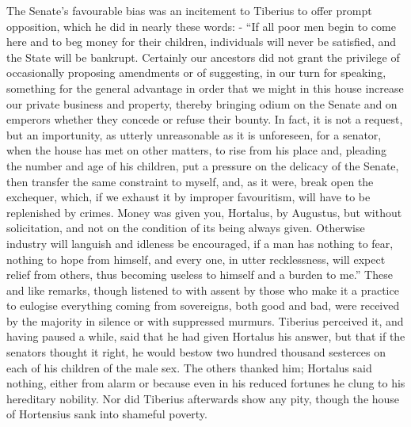 
The Senate's favourable bias was an incitement to Tiberius to offer prompt opposition, which he did in nearly these words: - ``If all poor men begin to come here and to beg money for their children, individuals will never be satisfied, and the State will be bankrupt. Certainly our ancestors did not grant the privilege of occasionally proposing amendments or of suggesting, in our turn for speaking, something for the general advantage in order that we might in this house increase our private business and property, thereby bringing odium on the Senate and on emperors whether they concede or refuse their bounty. In fact, it is not a request, but an importunity, as utterly unreasonable as it is unforeseen, for a senator, when the house has met on other matters, to rise from his place and, pleading the number and age of his children, put a pressure on the delicacy of the Senate, then transfer the same constraint to myself, and, as it were, break open the exchequer, which, if we exhaust it by improper favouritism, will have to be replenished by crimes. Money was given you, Hortalus, by Augustus, but without solicitation, and not on the condition of its being always given. Otherwise industry will languish and idleness be encouraged, if a man has nothing to fear, nothing to hope from himself, and every one, in utter recklessness, will expect relief from others, thus becoming useless to himself and a burden to me.'' These and like remarks, though listened to with assent by those who make it a practice to eulogise everything coming from sovereigns, both good and bad, were received by the majority in silence or with suppressed murmurs. Tiberius perceived it, and having paused a while, said that he had given Hortalus his answer, but that if the senators thought it right, he would bestow two hundred thousand sesterces on each of his children of the male sex. The others thanked him; Hortalus said nothing, either from alarm or because even in his reduced fortunes he clung to his hereditary nobility. Nor did Tiberius afterwards show any pity, though the house of Hortensius sank into shameful poverty.


